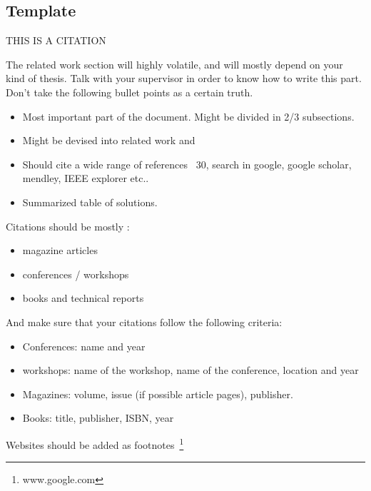 \subsection{Template} %
\label{sub:Template}


THIS IS A CITATION\cite{Braem2013a}
  
The related work section will highly volatile, and will mostly depend on your kind of thesis. Talk with your supervisor in order to know how to write this part. Don't take the following bullet points as a certain truth.

\begin{itemize}
  \item Most important part of the document. Might be divided in 2/3 subsections.
  \item Might be devised into related work and 
  \item Should cite a wide range of references ~30, search in google, google scholar, mendley, IEEE explorer etc..
  \item Summarized table of solutions.
\end{itemize}

Citations should be mostly :
\begin{itemize}
  \item magazine articles
  \item conferences / workshops
  \item books and technical reports
\end{itemize}
And make sure that your citations follow the following criteria:
\begin{itemize}
  \item Conferences: name and year
  \item workshops: name of the workshop, name of the conference, location and year
  \item Magazines: volume, issue (if possible article pages), publisher.
  \item Books: title, publisher, ISBN, year
\end{itemize}
Websites should be added as footnotes~\footnote{www.google.com}

